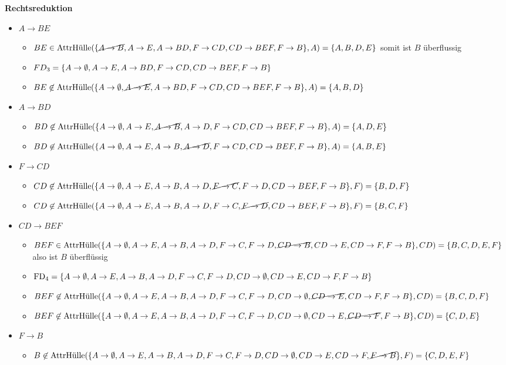 \documentclass[main.tex]{subfiles}
\begin{document}
\textbf{Rechtsreduktion}
\begin{itemize}
    \item $A\to BE$
    \begin{itemize}
        \item $BE \in \text{AttrHülle}(\{\cancel{A\to B}, A\to E, A\to BD, F\to CD, CD\to BEF, F\to B\}, A) = \{A, B, D, E\}$ somit ist $B$ überflussig
        \item $FD_3 = \{A\to \emptyset, A\to E, A\to BD, F\to CD, CD\to BEF, F\to B\}$
        \item $BE \not\in \text{AttrHülle}(\{A\to \emptyset, \cancel{A\to E}, A\to BD, F\to CD, CD\to BEF, F\to B\}, A) = \{A, B, D\}$
    \end{itemize}
    \item $A\to BD$
    \begin{itemize}
        \item $BD \not\in \text{AttrHülle}(\{A\to \emptyset, A\to E, \cancel{A\to B}, A\to D, F\to CD, CD\to BEF, F\to B\}, A) = \{A, D, E\}$
        \item $BD \not\in \text{AttrHülle}(\{A\to \emptyset, A\to E, A\to B, \cancel{A\to D}, F\to CD, CD\to BEF, F\to B\}, A) = \{A, B, E\}$
    \end{itemize}
    \item $F\to CD$
    \begin{itemize}
        \item $CD \not\in \text{AttrHülle}(\{A\to \emptyset, A\to E, A\to B, A\to D, \cancel{F\to C}, F\to D, CD\to BEF, F\to B\}, F) = \{B, D, F\}$
        \item $CD \not\in \text{AttrHülle}(\{A\to \emptyset, A\to E, A\to B, A\to D, F\to C, \cancel{F\to D}, CD\to BEF, F\to B\}, F) = \{B, C, F\}$
    \end{itemize}
    \item $CD\to BEF$
    \begin{itemize}
        \item $BEF \in \text{AttrHülle}(\{A\to \emptyset, A\to E, A\to B, A\to D, F\to C, F\to D, \cancel{CD\to B}, CD\to E, CD\to F, F\to B\}, CD) = \{B, C, D, E, F\}$ also ist $B$ überflüssig
        \item $\text{FD}_4 = \{A\to \emptyset, A\to E, A\to B, A\to D, F\to C, F\to D, CD\to\emptyset, CD\to E, CD\to F, F\to B\}$
        \item $BEF \not\in \text{AttrHülle}(\{A\to \emptyset, A\to E, A\to B, A\to D, F\to C, F\to D, CD\to\emptyset, \cancel{CD\to E}, CD\to F, F\to B\}, CD) = \{B, C, D, F\}$
        \item $BEF \not\in \text{AttrHülle}(\{A\to \emptyset, A\to E, A\to B, A\to D, F\to C, F\to D, CD\to\emptyset, CD\to E, \cancel{CD\to F}, F\to B\}, CD) = \{C, D, E\}$
    \end{itemize}
    \item $F\to B$
    \begin{itemize}
        \item $B \not\in \text{AttrHülle}(\{A\to \emptyset, A\to E, A\to B, A\to D, F\to C, F\to D, CD\to\emptyset, CD\to E, CD\to F, \cancel{F\to B}\}, F) = \{C, D, E, F\}$
    \end{itemize}
\end{itemize}
\end{document}
